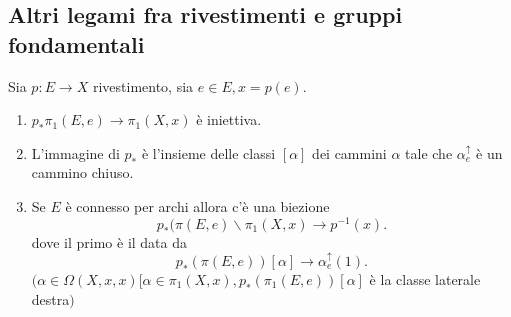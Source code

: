 \documentclass[12px]{article}
\begin{document}
\subsection{Altri legami fra rivestimenti e gruppi fondamentali}
\begin{teo}
	Sia $p: E \rightarrow X$ rivestimento, sia $e\in E, x = p(e)$.
	 \begin{enumerate}
		 \item $p_* \pi_1(E,e) \rightarrow \pi_1(X,x)$ è iniettiva.
		 \item L'immagine di $p_*$ è l'insieme delle classi  $[\alpha]$ dei cammini  $\alpha$ tale che $\alpha_e^\uparrow$ è un cammino chiuso.
		 \item  Se $E$ è connesso per archi allora c'è una biezione 
	\[
		p_*(\pi(E,e)\backslash \pi_1(X,x) \rightarrow p^{-1}(x)
		 .\] 
		 dove il primo è il
		 data da 
		 \[
			 p_*(\pi(E,e))[\alpha] \rightarrow \alpha_e^\uparrow(1)
		 .\] 
		 $(\alpha\in\Omega(X,x,x) [\alpha\in\pi_1(X,x), p_*(\pi_1(E,e))[\alpha]$ è la classe laterale destra$)$
	\end{enumerate}
\end{teo}
\end{document}

